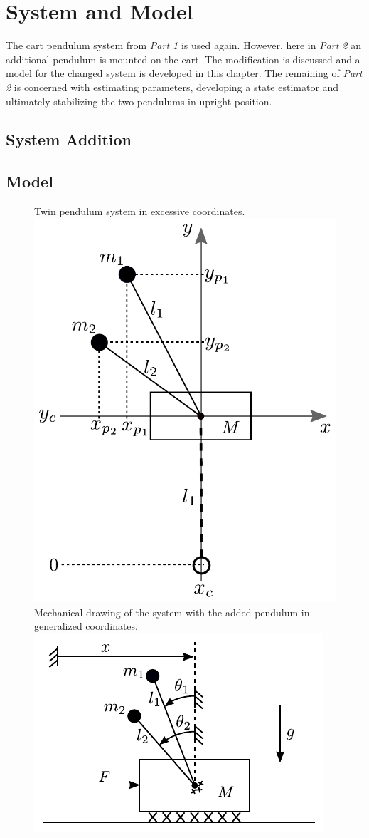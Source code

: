 \chapter{System and Model}
The cart pendulum system from \textit{Part 1} is used again. However, here in \textit{Part 2} an additional pendulum is mounted on the cart. The modification is discussed and a model for the changed system is developed in this chapter. The remaining of \textit{Part 2} is concerned with estimating parameters, developing a state estimator and ultimately stabilizing the two pendulums in upright position.

\section{System Addition}


\section{Model}

\begin{figure}[H]
  \captionbox
  {
    Twin pendulum system in excessive coordinates.
    \label{fig:excessiveCoordinatesTwin}
  }
  {
    \hspace{-1cm}
    \includegraphics[width=.35\textwidth]{figures/excessiveCoordinatesTwin}
  }
  \hspace{40pt}
  \captionbox
  {
    Mechanical drawing of the system with the added pendulum in generalized coordinates.
    \label{fig:mechanicalDrawingTwin}
  }
  {
    \hspace{-1cm}
    \includegraphics[width=.43\textwidth]{figures/mechanicalDrawingTwin}\vspace{1.2cm}
  }  
\end{figure}

